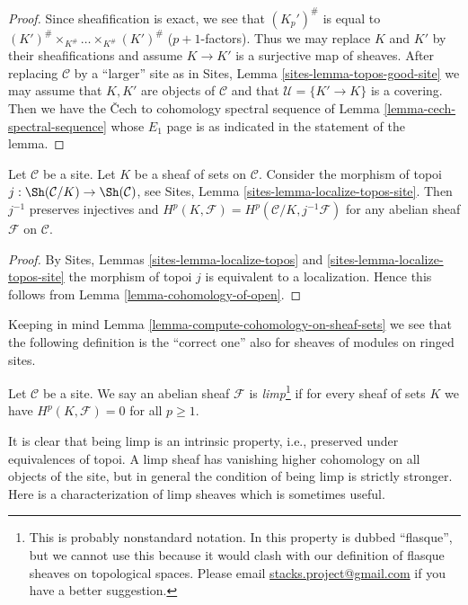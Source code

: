 \begin{proof}
Since sheafification is exact, we see that
$(K_p')^\#$ is equal to
$(K')^\# \times_{K^\#} \ldots \times_{K^\#} (K')^\#$
($p + 1$-factors). Thus we may replace $K$ and $K'$ by
their sheafifications and assume $K \to K'$ is a surjective
map of sheaves. After replacing $\mathcal{C}$ by a ``larger'' site as in
Sites, Lemma \ref{sites-lemma-topos-good-site} 
we may assume that $K, K'$ are objects of $\mathcal{C}$ and that
$\mathcal{U} = \{K' \to K\}$ is a covering. Then we have the {\v C}ech
to cohomology spectral sequence of Lemma \ref{lemma-cech-spectral-sequence}
whose $E_1$ page is as indicated in the statement of the lemma.
\end{proof}

\begin{lemma}
\label{lemma-cohomology-on-sheaf-sets}
Let $\mathcal{C}$ be a site. Let $K$ be a sheaf of sets on $\mathcal{C}$.
Consider the morphism of topoi
$j : \Sh(\mathcal{C}/K) \to \Sh(\mathcal{C})$, see
Sites, Lemma \ref{sites-lemma-localize-topos-site}.
Then $j^{-1}$ preserves injectives and
$H^p(K, \mathcal{F}) = H^p(\mathcal{C}/K, j^{-1}\mathcal{F})$
for any abelian sheaf $\mathcal{F}$ on $\mathcal{C}$.
\end{lemma}

\begin{proof}
By
Sites, Lemmas \ref{sites-lemma-localize-topos} and
\ref{sites-lemma-localize-topos-site}
the morphism of topoi $j$ is
equivalent to a localization. Hence this follows from
Lemma \ref{lemma-cohomology-of-open}.
\end{proof}

\noindent
Keeping in mind Lemma \ref{lemma-compute-cohomology-on-sheaf-sets}
we see that the following definition is the ``correct one'' also
for sheaves of modules on ringed sites.

\begin{definition}
\label{definition-limp}
Let $\mathcal{C}$ be a site.
We say an abelian sheaf $\mathcal{F}$ is
{\it limp}\footnote{This is probably nonstandard notation.
In \cite[V, Definition 4.1]{SGA4} this property is dubbed ``flasque'', but
we cannot use this because it would clash with our definition
of flasque sheaves on topological spaces. Please email
\href{mailto:stacks.project@gmail.com}{stacks.project@gmail.com}
if you have a better suggestion.}
if for every sheaf of sets $K$ we have $H^p(K, \mathcal{F}) = 0$
for all $p \geq 1$.
\end{definition}

\noindent
It is clear that being limp is an intrinsic property, i.e.,
preserved under equivalences of topoi.
A limp sheaf has vanishing higher cohomology on all objects of the site,
but in general the condition of being limp is strictly stronger.
Here is a characterization of limp sheaves which is sometimes useful.

